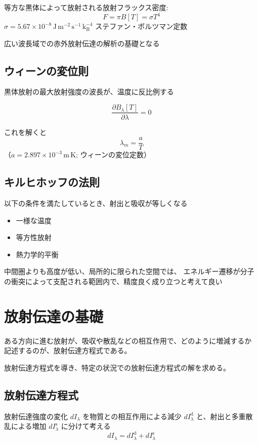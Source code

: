 \documentclass[article]{dennou777}
\newcommand{\Unit}[1]{\,\mathrm{#1}}
\begin{document}
等方な黒体によって放射される放射フラックス密度:
\begin{equation}
	F=\pi B[T]=\sigma T^4
\end{equation}
$\sigma=5.67\times10^{-8}\Unit{J\,m^{-2}\,s^{-1}\,k_\mathrm{B}^{-4}}$
ステファン・ボルツマン定数

広い波長域での赤外放射伝達の解析の基礎となる

\subsection{ウィーンの変位則}
黒体放射の最大放射強度の波長が、温度に反比例する

\begin{equation}
	\frac{\partial B_\lambda[T]}{\partial\lambda}=0
\end{equation}

これを解くと
\begin{equation}
	\lambda_m=\frac{a}{T}
\end{equation}
（$a=2.897\times10^{-3}\Unit{m\,K}$; ウィーンの変位定数）

\subsection{キルヒホッフの法則}
以下の条件を満たしているとき、射出と吸収が等しくなる

\begin{itemize}
	\item 一様な温度
	\item 等方性放射
	\item 熱力学的平衡
\end{itemize}

中間圏よりも高度が低い、局所的に限られた空間では、
エネルギー遷移が分子の衝突によって支配される範囲内で、精度良く成り立つと考えて良い

\section{放射伝達の基礎}
ある方向に進む放射が、吸収や散乱などの相互作用で、どのように増減するか
記述するのが、放射伝達方程式である。

放射伝達方程式を導き、特定の状況での放射伝達方程式の解を求める。

\subsection{放射伝達方程式}
放射伝達強度の変化 $dI_\lambda$ を物質との相互作用による減少
$dI_\lambda^\mathrm{d}$ と、射出と多重散乱による増加
$dI_\lambda^\mathrm{s}$ に分けて考える
\begin{equation}
	dI_\lambda=dI_\lambda^\mathrm{d}+dI_\lambda^\mathrm{s}
\end{equation}
\end{document}
